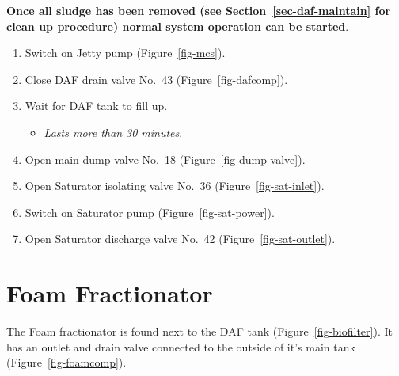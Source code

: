 \documentclass[
  letterpaper,
  DIV=11,
  numbers=noendperiod]{scrreprt}
\providecommand{\tightlist}{%
  \setlength{\itemsep}{0pt}\setlength{\parskip}{0pt}}\usepackage{longtable,booktabs,array}
\begin{document}
\textbf{Once all sludge has been removed (see
Section~\ref{sec-daf-maintain} for clean up procedure) normal system
operation can be started}.

\begin{enumerate}
\def\labelenumi{\arabic{enumi}.}
\setcounter{enumi}{20}
\tightlist
\item
  Switch on Jetty pump (Figure~\ref{fig-mcs}).
\item
  Close DAF drain valve No.~43 (Figure~\ref{fig-dafcomp}).
\item
  Wait for DAF tank to fill up.

  \begin{itemize}
  \tightlist
  \item
    \emph{Lasts more than 30 minutes}.
  \end{itemize}
\item
  Open main dump valve No.~18 (Figure~\ref{fig-dump-valve}).
\item
  Open Saturator isolating valve No.~36 (Figure~\ref{fig-sat-inlet}).
\item
  Switch on Saturator pump (Figure~\ref{fig-sat-power}).
\item
  Open Saturator discharge valve No.~42 (Figure~\ref{fig-sat-outlet}).
\end{enumerate}

\hypertarget{sec-fractionator}{%
\chapter{Foam Fractionator}\label{sec-fractionator}}

The Foam fractionator is found next to the DAF tank
(Figure~\ref{fig-biofilter}). It has an outlet and drain valve connected
to the outside of it's main tank (Figure~\ref{fig-foamcomp}).
\end{document}

